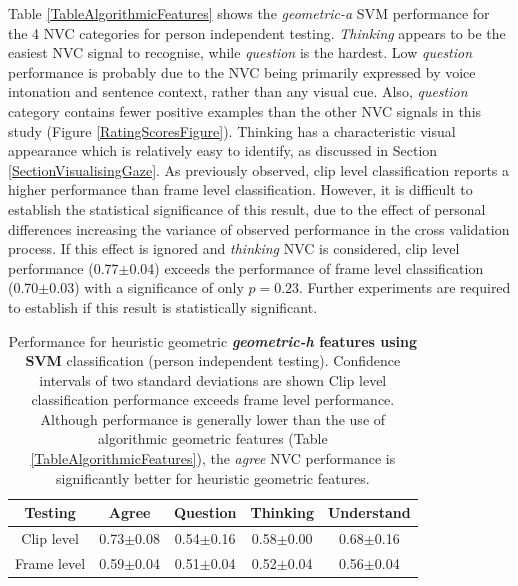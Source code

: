 Table \ref{TableAlgorithmicFeatures} shows the \textit{geometric-a} SVM performance for the 4 \ac{NVC} categories for person independent testing. 
\textit{Thinking} appears to be the easiest \ac{NVC} signal to recognise, while \textit{question} is the hardest. 
Low \textit{question} performance is probably due to the \ac{NVC} being primarily expressed by voice intonation \cite{Verderber2007} and sentence context, rather than any visual cue. Also, \textit{question} category contains fewer positive examples than the other \ac{NVC} signals in this study (Figure \ref{RatingScoresFigure}). Thinking has a characteristic visual appearance which is relatively easy to identify, as discussed in Section \ref{SectionVisualisingGaze}.
As previously observed, clip level classification reports a higher performance than frame level classification. %
However, it is difficult to establish the statistical significance of this result, due to the effect of personal differences increasing the variance of observed performance in the cross validation process. If this effect is ignored and \textit{thinking} \ac{NVC} is considered, clip level performance (0.77$\pm$0.04) exceeds the performance of frame level classification (0.70$\pm$0.03) with a significance of only $p=0.23$. Further experiments are required to establish if this result is statistically significant.

\begin{table}[tb]
\centering
\caption[\ac{AUC} Performance for heuristic geometric \textbf{\textit{geometric-h} features using SVM} classification (person independent testing).]{Performance for heuristic geometric \textbf{\textit{geometric-h} features using SVM} classification (person independent testing). Confidence intervals of two standard deviations are shown Clip level classification performance exceeds frame level performance. Although performance is generally lower than the use of algorithmic geometric features (Table \ref{TableAlgorithmicFeatures}), the \textit{agree} NVC performance is significantly better for heuristic geometric features.}
\begin{tabular}{ c | c | c | c | c }
\hline
Testing & Agree & Question & Thinking & Understand\\
\hline
Clip level & 0.73$\pm$0.08 & 0.54$\pm$0.16 & 0.58$\pm$0.00 & 0.68$\pm$0.16\\ %
Frame level & 0.59$\pm$0.04 & 0.51$\pm$0.04 & 0.52$\pm$0.04 & 0.56$\pm$0.04\\ %
\hline
\end{tabular}
\label{TableHeuristicFeatures}
\end{table}


